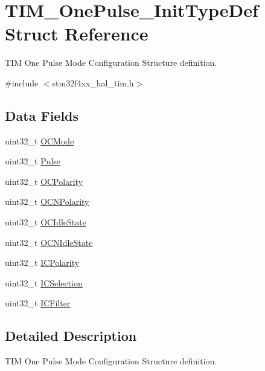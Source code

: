 \hypertarget{struct_t_i_m___one_pulse___init_type_def}{}\section{T\+I\+M\+\_\+\+One\+Pulse\+\_\+\+Init\+Type\+Def Struct Reference}
\label{struct_t_i_m___one_pulse___init_type_def}


T\+IM One Pulse Mode Configuration Structure definition.  




{\ttfamily \#include $<$stm32f4xx\+\_\+hal\+\_\+tim.\+h$>$}

\subsection*{Data Fields}
\begin{DoxyCompactItemize}
\item 
uint32\+\_\+t \hyperlink{struct_t_i_m___one_pulse___init_type_def_af127f01162853e39ae616b43cc52b674}{O\+C\+Mode}
\item 
uint32\+\_\+t \hyperlink{struct_t_i_m___one_pulse___init_type_def_a4f1fbf6d60812c3194e9ee8a05f5cfa6}{Pulse}
\item 
uint32\+\_\+t \hyperlink{struct_t_i_m___one_pulse___init_type_def_a3028787ad41698072cbf70ddf1b6c984}{O\+C\+Polarity}
\item 
uint32\+\_\+t \hyperlink{struct_t_i_m___one_pulse___init_type_def_a00deac6c3347b0482955d936351c6388}{O\+C\+N\+Polarity}
\item 
uint32\+\_\+t \hyperlink{struct_t_i_m___one_pulse___init_type_def_aef11bcea1dbf3e3ddf2a4bbc2846bb1e}{O\+C\+Idle\+State}
\item 
uint32\+\_\+t \hyperlink{struct_t_i_m___one_pulse___init_type_def_a37bc0a680d53458bf4c42ebb277b0c2c}{O\+C\+N\+Idle\+State}
\item 
uint32\+\_\+t \hyperlink{struct_t_i_m___one_pulse___init_type_def_a8589cf95218ea62604b845054b36b772}{I\+C\+Polarity}
\item 
uint32\+\_\+t \hyperlink{struct_t_i_m___one_pulse___init_type_def_a9e8853f17e85393a869aa2ecb315f030}{I\+C\+Selection}
\item 
uint32\+\_\+t \hyperlink{struct_t_i_m___one_pulse___init_type_def_a883e69dec14d8bde9914906be1b04ad7}{I\+C\+Filter}
\end{DoxyCompactItemize}


\subsection{Detailed Description}
T\+IM One Pulse Mode Configuration Structure definition. 

